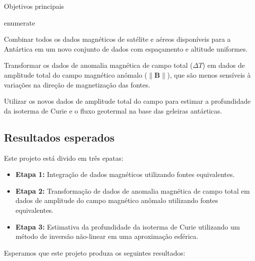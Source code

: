 \documentclass[11pt,a4paper,oneside]{book}
\begin{document}
\begin{summarybox}{\faBullseye{} Objetivos principais}
  \begin{listnomargin}{enumerate}
    \item Combinar todos os dados magnéticos de satélite e aéreos disponíveis
      para a Antártica em um novo conjunto de dados com espaçamento e altitude
      uniformes.
    \item Transformar os dados de anomalia magnética de campo total ($\Delta
      T$) em dados de amplitude total do campo magnético anômalo
      ($\|\mathbf{B}\|$), que são menos sensíveis à variações na direção de
      magnetização das fontes.
    \item Utilizar os novos dados de amplitude total do campo para estimar a
      profundidade da isoterma de Curie e o fluxo geotermal na base das
      geleiras antárticas.
  \end{listnomargin}
\end{summarybox}

\subsection{Resultados esperados}

Este projeto está divido em três epatas:

\begin{itemize}
  \item \textbf{Etapa 1:} Integração de dados magnéticos utilizando fontes
    equivalentes.
  \item \textbf{Etapa 2:} Transformação de dados de anomalia magnética de campo
    total em dados de amplitude do campo magnético anômalo utilizando fontes
    equivalentes.
  \item \textbf{Etapa 3:} Estimativa da profundidade da isoterma de Curie
    utilizando um método de inversão não-linear em uma aproximação esférica.
\end{itemize}

\noindent
Esperamos que este projeto produza os seguintes resultados:
\end{document}
